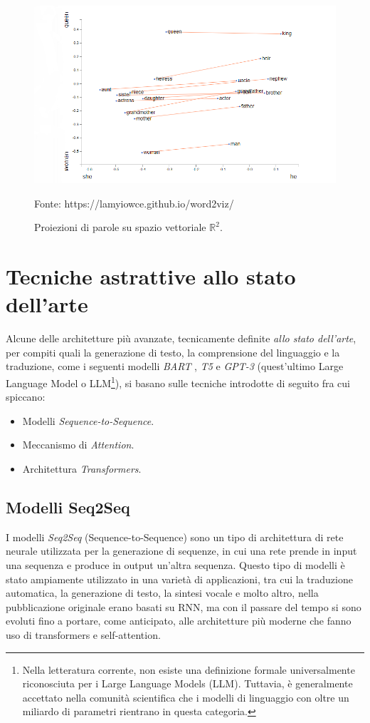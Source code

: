\documentclass[12pt,a4paper,twoside,openright]{book}
\begin{document}
\begin{figure}
    \centering
    \includegraphics[width=\textwidth]{images/word2vec-example.png}
    \caption{Proiezioni di parole su spazio vettoriale $\mathbb{R}^2$.}
    \tiny{Fonte: https://lamyiowce.github.io/word2viz/}
    \label{fig:word-embeddings}
\end{figure}

\section{Tecniche astrattive allo stato dell'arte}
Alcune delle architetture più avanzate, tecnicamente definite \emph{allo stato dell'arte}, per compiti quali la generazione di testo, la comprensione del linguaggio e la traduzione, come i seguenti modelli \emph{BART} \cite{DBLP:journals/corr/abs-1910-13461}, \emph{T5} \cite{DBLP:journals/corr/abs-1910-10683} e \emph{GPT-3} \cite{DBLP:journals/corr/abs-2005-14165} (quest'ultimo Large Language Model o LLM\footnote{Nella letteratura corrente, non esiste una definizione formale universalmente riconosciuta per i Large Language Models (LLM). Tuttavia, è generalmente accettato nella comunità scientifica che i modelli di linguaggio con oltre un miliardo di parametri rientrano in questa categoria.}), si basano sulle tecniche introdotte di seguito fra cui spiccano:
\begin{itemize}
    \item Modelli \emph{Sequence-to-Sequence}.
    \item Meccanismo di \emph{Attention}.
    \item Architettura \emph{Transformers}.
\end{itemize}

\subsection{Modelli Seq2Seq}
I modelli \emph{Seq2Seq} (Sequence-to-Sequence) sono un tipo di architettura di rete neurale utilizzata per la generazione di sequenze, in cui una rete prende in input una sequenza e produce in output un'altra sequenza. Questo tipo di modelli è stato ampiamente utilizzato in una varietà di applicazioni, tra cui la traduzione automatica, la generazione di testo, la sintesi vocale e molto altro, nella pubblicazione originale \cite{cho2014learning} erano basati su RNN, ma con il passare del tempo si sono evoluti fino a portare, come anticipato, alle architetture più moderne che fanno uso di transformers e self-attention.
\end{document}
